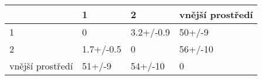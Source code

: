 \begin{tabular}{llll}
\toprule
{} &          1 &          2 & vnější prostředí \\
\midrule
1                &          0 &  3.2+/-0.9 &           50+/-9 \\
2                &  1.7+/-0.5 &          0 &          56+/-10 \\
vnější prostředí &     51+/-9 &    54+/-10 &                0 \\
\bottomrule
\end{tabular}
